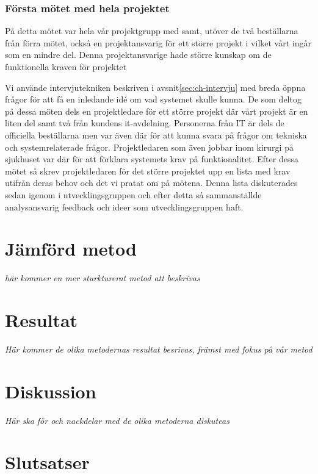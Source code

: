 \subsubsection{Första mötet med hela projektet}
På detta mötet var hela vår projektgrupp med samt, utöver de två beställarna från förra mötet, också en projektansvarig för ett större projekt i vilket vårt ingår som en mindre del. Denna projektansvarige hade större kunskap om de funktionella kraven för projektet 

Vi använde intervjutekniken beskriven i avsnit\ref{sec:ch-intervju} med breda öppna frågor för att få en inledande idé om vad systemet skulle kunna. De som deltog på dessa möten dels en projektledare för ett större projekt där vårt projekt är en liten del samt två från kundens it-avdelning. Personerna från IT är dels de officiella beställarna men var även där för att kunna svara på frågor om tekniska och systemrelaterade frågor. Projektledaren som även jobbar inom kirurgi på sjukhuset var där för att förklara systemets krav på funktionalitet. Efter dessa mötet så skrev projektledaren för det större projektet upp en lista med krav utifrån deras behov och det vi pratat om på mötena. Denna lista diskuterades sedan igenom i utvecklingsgruppen och efter detta så sammanställde analysansvarig feedback och ideer som utvecklingsgruppen haft. 

\section{Jämförd metod}
\emph{här kommer en mer sturkturerat metod att beskrivas}

\section{Resultat}
\emph{Här kommer de olika metodernas resultat besrivas, främst med fokus på vår metod}


\section{Diskussion}
\emph{Här ska för och nackdelar med de olika metoderna diskuteas}

\section{Slutsatser}






